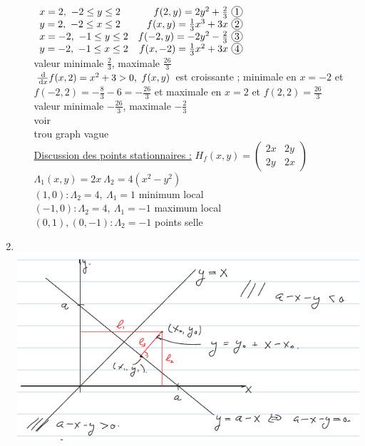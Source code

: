 \documentclass[12pt,a4paper]{article}
\begin{document}
\begin{enumerate}
\begin{enumerate}
						$\begin{array}{lr}
							x=2,\ -2 \leq y \leq 2 & f(2,y) = 2y^2 + \frac{2}{3}\ \circled{1}\\
							y=2,\ -2 \leq x \leq 2 & f(x,y) = \frac{1}{3}x^3 + 3x\ \circled{2}\\
							x=-2,\ -1\leq y \leq 2 & f(-2,y) = -2y^2 - \frac{2}{3}\ \circled{3}\\
							y = -2,\ -1\leq x \leq 2 & f(x,-2) = \frac{1}{3}x^2 + 3x \ \circled{4}
						\end{array}$\\
						 valeur minimale $\frac{2}{3}$, maximale $\frac{26}{3}$\\
						 $\frac{\, \mathrm d }{\, \mathrm d x} f(x,2) = x^2 + 3 > 0,\ f(x,y)$ est croissante ; minimale en $x = -2$ et $f(-2,2) = -\frac{8}{3} - 6 = - \frac{26}{3}$ et maximale en $x=2$ et $f(2,2) = \frac{26}{3}$\\
						 valeur minimale  $-\frac{26}{3}$, maximale $-\frac{2}{3}$\\
						\circled{2} voir \\
						{trou graph vague}\\
						\uline{Discussion des points stationnaires :}
						$H_f(x,y) = \begin{pmatrix}
						2x & 2y\\
						2y & 2x
						\end{pmatrix}$\\
						$\Lambda_1(x,y) = 2x\ \Lambda_2 = 4(x^2-y^2)$\\
						$(1,0) : \Lambda_2 = 4,\ \Lambda_1 =1$ 	minimum local\\
						$(-1,0) : \Lambda_2 = 4,\ \Lambda_1 = -1$ maximum local \\
						$(0,1),(0,-1) : \Lambda_2 	 = -1$ points selle
			\end{enumerate} 
	\item 	{}\\
			\includegraphics[scale=0.5]{images/appli_geom}\\

\end{enumerate}
\end{document}
